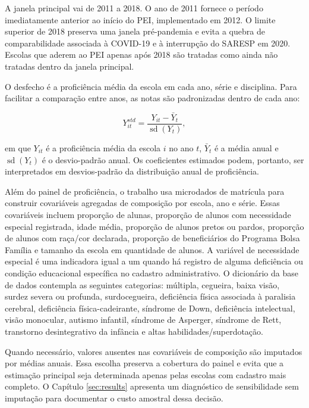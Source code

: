 A janela principal vai de 2011 a 2018. O ano de 2011 fornece o período imediatamente anterior ao início do PEI, implementado em 2012. O limite superior de 2018 preserva uma janela pré-pandemia e evita a quebra de comparabilidade associada à COVID-19 e à interrupção do SARESP em 2020. Escolas que aderem ao PEI apenas após 2018 são tratadas como ainda não tratadas dentro da janela principal.

O desfecho é a proficiência média da escola em cada ano, série e disciplina. Para facilitar a comparação entre anos, as notas são padronizadas dentro de cada ano:

\begin{equation}
Y_{it}^{std} = \frac{Y_{it} - \bar{Y}_{t}}{\operatorname{sd}(Y_t)},
\end{equation}

em que $Y_{it}$ é a proficiência média da escola $i$ no ano $t$, $\bar{Y}_{t}$ é a média anual e $\operatorname{sd}(Y_t)$ é o desvio-padrão anual. Os coeficientes estimados podem, portanto, ser interpretados em desvios-padrão da distribuição anual de proficiência.

Além do painel de proficiência, o trabalho usa microdados de matrícula para construir covariáveis agregadas de composição por escola, ano e série. Essas covariáveis incluem proporção de alunas, proporção de alunos com necessidade especial registrada, idade média, proporção de alunos pretos ou pardos, proporção de alunos com raça/cor declarada, proporção de beneficiários do Programa Bolsa Família e tamanho da escola em quantidade de alunos. A variável de necessidade especial é uma indicadora igual a um quando há registro de alguma deficiência ou condição educacional específica no cadastro administrativo. O dicionário da base de dados contempla as seguintes categorias: múltipla, cegueira, baixa visão, surdez severa ou profunda, surdocegueira, deficiência física associada à paralisia cerebral, deficiência física-cadeirante, síndrome de Down, deficiência intelectual, visão monocular, autismo infantil, síndrome de Asperger, síndrome de Rett, transtorno desintegrativo da infância e altas habilidades/superdotação.

Quando necessário, valores ausentes nas covariáveis de composição são imputados por médias anuais. Essa escolha preserva a cobertura do painel e evita que a estimação principal seja determinada apenas pelas escolas com cadastro mais completo. O Capítulo \ref{sec:results} apresenta um diagnóstico de sensibilidade sem imputação para documentar o custo amostral dessa decisão.

